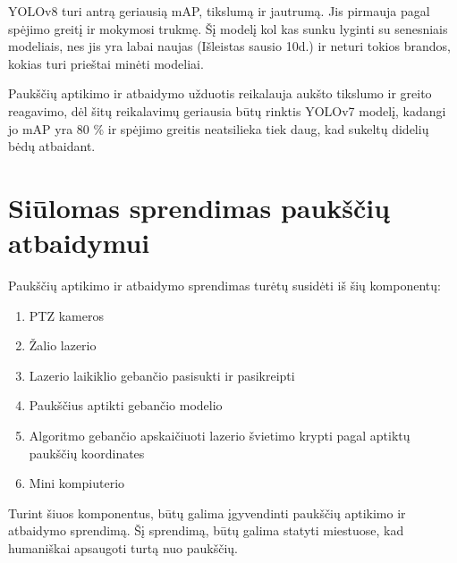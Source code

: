 \documentclass{VUMIFPSkursinis}
\begin{document}
YOLOv8 turi antrą geriausią mAP, tikslumą ir jautrumą. Jis pirmauja pagal spėjimo greitį ir mokymosi trukmę. Šį modelį kol kas sunku lyginti su senesniais modeliais, nes jis yra labai naujas (Išleistas sausio 10d.) ir neturi tokios brandos, kokias turi prieštai minėti modeliai. 

Paukščių aptikimo ir atbaidymo užduotis reikalauja aukšto tikslumo ir greito reagavimo, dėl šitų reikalavimų geriausia būtų rinktis YOLOv7 modelį, kadangi jo mAP yra 80 \% ir spėjimo greitis neatsilieka tiek daug, kad sukeltų didelių bėdų atbaidant.

\begin{table}[H]
\centering
{}
\caption{YOLO modelių rezultatai.}
\label{tab:my-table}
\end{table}


\section{Siūlomas sprendimas paukščių atbaidymui}
Paukščių aptikimo ir atbaidymo sprendimas turėtų susidėti iš šių komponentų:
\begin{enumerate}
    \item PTZ kameros
    \item Žalio lazerio
    \item Lazerio laikiklio gebančio pasisukti ir pasikreipti
    \item Paukščius aptikti gebančio modelio
    \item Algoritmo gebančio apskaičiuoti lazerio švietimo krypti pagal aptiktų paukščių koordinates
    \item Mini kompiuterio
\end{enumerate}

Turint šiuos komponentus, būtų galima įgyvendinti paukščių aptikimo ir atbaidymo sprendimą. Šį sprendimą, būtų galima statyti miestuose, kad humaniškai apsaugoti turtą nuo paukščių.
\end{document}

